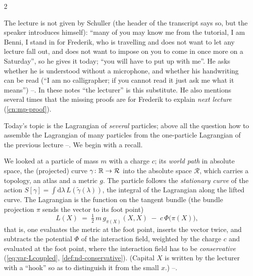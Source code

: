 \begin{paracol}{2}
\begin{coursenote}\label{cn:mp-benni}
The lecture is not given by Schuller (the header of the transcript says so, but the speaker introduces himself): ``many of you may know me from the tutorial, I am Benni, I stand in for Frederik, who is travelling and does not want to let any lecture fall out, and does not want to impose on you to come in once more on a Saturday'', so he gives it today; ``you will have to put up with me''. He asks whether he is understood without a microphone, and whether his handwriting can be read (``I am no calligrapher; if you cannot read it just ask me what it means'') --. In these notes ``the lecturer'' is this substitute. He also mentions several times that the missing proofs are for Frederik to explain \emph{next lecture} (\cref{cn:mp-proof}).
\end{coursenote}

Today's topic is the Lagrangian of \emph{several} particles; above all the question how to assemble the Lagrangian of many particles from the one-particle Lagrangian of the previous lecture --. We begin with a recall.

\begin{recall}\label{rec:mp-one}
We looked at a particle of mass $m$ with a charge $c$; its \emph{world path} in absolute space, the (projected) curve $\gamma\colon\mathbb{R}\to\mathcal R$ into the absolute space $\mathcal R$, which carries a topology, an atlas and a metric $g$. The particle follows the \emph{stationary curve} of the action $S[\gamma]=\int\mathrm d\lambda\,L(\tilde\gamma(\lambda))$, the integral of the Lagrangian along the lifted curve. The Lagrangian is the function on the tangent bundle (the bundle projection $\pi$ sends the vector to its foot point)
\[
  L(X)\;=\;\tfrac12\,m\,g_{\pi(X)}(X,X)\;-\;c\,\Phi\bigl(\pi(X)\bigr),
\]
that is, one evaluates the metric at the foot point, inserts the vector twice, and subtracts the potential $\Phi$ of the interaction field, weighted by the charge $c$ and evaluated at the foot point, where the interaction field has to be \emph{conservative} (\cref{eq:var-Lcoupled}, \cref{def:nd-conservative}). (Capital $X$ is written by the lecturer with a ``hook'' so as to distinguish it from the small $x$.) --.
\end{recall}


\end{paracol}
